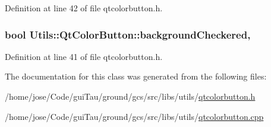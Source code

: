 Definition at line 42 of file qtcolorbutton.\-h.

\hypertarget{class_utils_1_1_qt_color_button_a4610a035893dd4f90c4ce55ac5a91592}{
\subsubsection[{background\-Checkered}]{\setlength{\rightskip}{0pt plus 5cm}bool Utils\-::\-Qt\-Color\-Button\-::background\-Checkered\hspace{0.3cm}{\ttfamily [read]}, {\ttfamily [write]}}}\label{class_utils_1_1_qt_color_button_a4610a035893dd4f90c4ce55ac5a91592}


Definition at line 41 of file qtcolorbutton.\-h.



The documentation for this class was generated from the following files\-:\begin{DoxyCompactItemize}
\item 
/home/jose/\-Code/gui\-Tau/ground/gcs/src/libs/utils/\hyperlink{qtcolorbutton_8h}{qtcolorbutton.\-h}\item 
/home/jose/\-Code/gui\-Tau/ground/gcs/src/libs/utils/\hyperlink{qtcolorbutton_8cpp}{qtcolorbutton.\-cpp}\end{DoxyCompactItemize}
